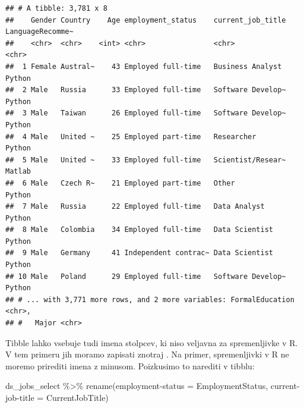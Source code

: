 \documentclass[
]{book}
\newenvironment{Shaded}{\begin{snugshade}}{\end{snugshade}}
\newcommand{\AttributeTok}[1]{\textcolor[rgb]{0.77,0.63,0.00}{#1}}
\newcommand{\FunctionTok}[1]{\textcolor[rgb]{0.00,0.00,0.00}{#1}}
\newcommand{\NormalTok}[1]{#1}
\newcommand{\OtherTok}[1]{\textcolor[rgb]{0.56,0.35,0.01}{#1}}
\newcommand{\SpecialCharTok}[1]{\textcolor[rgb]{0.00,0.00,0.00}{#1}}
\newcommand{\StringTok}[1]{\textcolor[rgb]{0.31,0.60,0.02}{#1}}
\begin{document}
\begin{verbatim}
## # A tibble: 3,781 x 8
##    Gender Country    Age employment_status    current_job_title LanguageRecomme~
##    <chr>  <chr>    <int> <chr>                <chr>             <chr>           
##  1 Female Austral~    43 Employed full-time   Business Analyst  Python          
##  2 Male   Russia      33 Employed full-time   Software Develop~ Python          
##  3 Male   Taiwan      26 Employed full-time   Software Develop~ Python          
##  4 Male   United ~    25 Employed part-time   Researcher        Python          
##  5 Male   United ~    33 Employed full-time   Scientist/Resear~ Matlab          
##  6 Male   Czech R~    21 Employed part-time   Other             Python          
##  7 Male   Russia      22 Employed full-time   Data Analyst      Python          
##  8 Male   Colombia    34 Employed full-time   Data Scientist    Python          
##  9 Male   Germany     41 Independent contrac~ Data Scientist    Python          
## 10 Male   Poland      29 Employed full-time   Software Develop~ Python          
## # ... with 3,771 more rows, and 2 more variables: FormalEducation <chr>,
## #   Major <chr>
\end{verbatim}

Tibble lahko vsebuje tudi imena stolpcev, ki niso veljavna za spremenljivke v R. V tem primeru jih moramo zapisati znotraj \texttt{\textasciigrave{}}. Na primer, spremenljivki v R ne moremo prirediti imena z minusom. Poizkusimo to narediti v tibblu:

\begin{Shaded}
\begin{Highlighting}[]
\NormalTok{ds\_jobs\_select }\SpecialCharTok{\%\textgreater{}\%}
  \FunctionTok{rename}\NormalTok{(}\StringTok{\textasciigrave{}}\AttributeTok{employment{-}status}\StringTok{\textasciigrave{}} \OtherTok{=}\NormalTok{ EmploymentStatus,}
         \StringTok{\textasciigrave{}}\AttributeTok{current{-}job{-}title}\StringTok{\textasciigrave{}} \OtherTok{=}\NormalTok{ CurrentJobTitle)}
\end{Highlighting}
\end{Shaded}
\end{document}

